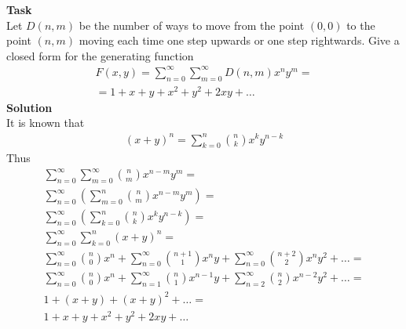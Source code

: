 \noindent
\textbf{Task}\\
Let $D(n,m)$ be the number of ways to move from the point $(0,0)$ to the point $(n,m)$ moving each time one step upwards or one step rightwards. Give a closed form for the generating function
\begin{gather*}
	F(x, y)=\sum_{n=0}^{\infty} \sum_{m=0}^{\infty} D(n, m) x^{n} y^{m} = \\
	= 1 + x + y + x^{2} + y^{2} + 2xy + \ldots
\end{gather*}
\vskip 0.1in
\noindent
\textbf{Solution}\\
It is known that
\begin{gather*}
(x+y)^n = \sum_{k=0}^{n} {{n} \choose {k}} x^k y^{n-k}
\end{gather*}
Thus
\begin{gather*}
	\sum_{n=0}^{\infty} \sum_{m=0}^{\infty} {{n} \choose {m}} x^{n-m} y^{m}  =\\
	\sum_{n=0}^{\infty} \left(\sum_{m=0}^{n} {{n} \choose {m}} x^{n-m} y^{m} \right) =\\
	\sum_{n=0}^{\infty} \left(\sum_{k=0}^{n} {{n} \choose {k}} x^{k} y^{n-k} \right) =\\
	\sum_{n=0}^{\infty} \sum_{k=0}^{n} (x+y)^n =\\
	\sum_{n=0}^{\infty} {{n} \choose {0}} x^n + \sum_{n=0}^{\infty} {{n+1} \choose {1}} x^n y + \sum_{n=0}^{\infty} {{n+2} \choose {2}} x^n y^2 + \ldots =\\
	\sum_{n=0}^{\infty} {{n} \choose {0}} x^n + \sum_{n=1}^{\infty} {{n} \choose {1}} x^{n-1} y + \sum_{n=2}^{\infty} {{n} \choose {2}} x^{n-2} y^2 + \ldots =\\
	1 + (x+y) + (x+y)^2 + \ldots =\\
	1 + x + y + x^{2} + y^{2} + 2xy + \ldots
\end{gather*}